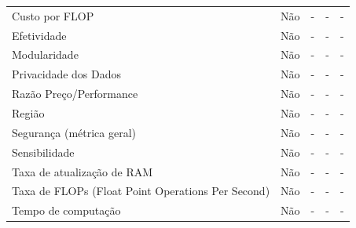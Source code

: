 \documentclass[conference]{IEEEtran}
\begin{document}
\begin{table}[]
\begin{tabular}{@{}lcccc@{}}
Custo por FLOP                                    & \cellcolor[HTML]{EA9999}Não             & \cellcolor[HTML]{EA9999}-               & \cellcolor[HTML]{EA9999}-               & \cellcolor[HTML]{EA9999}-   \\
Efetividade                                       & \cellcolor[HTML]{EA9999}Não             & \cellcolor[HTML]{EA9999}-               & \cellcolor[HTML]{EA9999}-               & \cellcolor[HTML]{EA9999}-   \\
Modularidade                                      & \cellcolor[HTML]{EA9999}Não             & \cellcolor[HTML]{EA9999}-               & \cellcolor[HTML]{EA9999}-               & \cellcolor[HTML]{EA9999}-   \\
Privacidade dos Dados                             & \cellcolor[HTML]{EA9999}Não             & \cellcolor[HTML]{EA9999}-               & \cellcolor[HTML]{EA9999}-               & \cellcolor[HTML]{EA9999}-   \\
Razão Preço/Performance                           & \cellcolor[HTML]{EA9999}Não             & \cellcolor[HTML]{EA9999}-               & \cellcolor[HTML]{EA9999}-               & \cellcolor[HTML]{EA9999}-   \\
Região                                            & \cellcolor[HTML]{EA9999}Não             & \cellcolor[HTML]{EA9999}-               & \cellcolor[HTML]{EA9999}-               & \cellcolor[HTML]{EA9999}-   \\
Segurança (métrica geral)                         & \cellcolor[HTML]{EA9999}Não             & \cellcolor[HTML]{EA9999}-               & \cellcolor[HTML]{EA9999}-               & \cellcolor[HTML]{EA9999}-   \\
Sensibilidade                                     & \cellcolor[HTML]{EA9999}Não             & \cellcolor[HTML]{EA9999}-               & \cellcolor[HTML]{EA9999}-               & \cellcolor[HTML]{EA9999}-   \\
Taxa de atualização de RAM                        & \cellcolor[HTML]{EA9999}Não             & \cellcolor[HTML]{EA9999}-               & \cellcolor[HTML]{EA9999}-               & \cellcolor[HTML]{EA9999}-   \\
Taxa de FLOPs (Float Point Operations Per Second) & \cellcolor[HTML]{EA9999}Não             & \cellcolor[HTML]{EA9999}-               & \cellcolor[HTML]{EA9999}-               & \cellcolor[HTML]{EA9999}-   \\
Tempo de computação                               & \cellcolor[HTML]{EA9999}Não             & \cellcolor[HTML]{EA9999}-               & \cellcolor[HTML]{EA9999}-               & \cellcolor[HTML]{EA9999}-   \\

\end{tabular}
\end{table}
\end{document}
